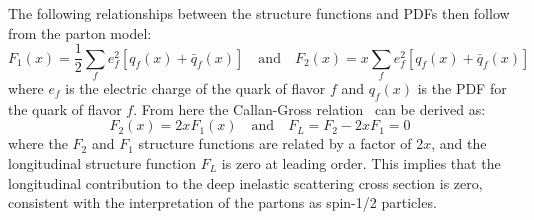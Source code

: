 The following relationships between the structure functions and PDFs then follow from the parton model:
\begin{equation}
    F_1(x) = \frac{1}{2} \sum_f e_f^2 [q_f(x) + \bar{q}_f(x)] \quad \text{and} \quad
    F_2(x) = x \sum_f e_f^2 [q_f(x) + \bar{q}_f(x)]
\end{equation}
where $e_f$ is the electric charge of the quark of flavor $f$ and $q_f(x)$ is the PDF for the quark of flavor $f$.
From here the Callan-Gross relation~\cite{Callan:1969uq} can be derived as:
\begin{equation}
    F_2(x) = 2x F_1(x) \quad \text{and} \quad F_L = F_2 - 2xF_1 = 0
\end{equation}
where the $F_2$ and $F_1$ structure functions are related by a factor of 2$x$, and the longitudinal structure function $F_L$ is zero at leading order.
This implies that the longitudinal contribution to the deep inelastic scattering cross section is zero, consistent with the interpretation of the partons as spin-1/2 particles.

